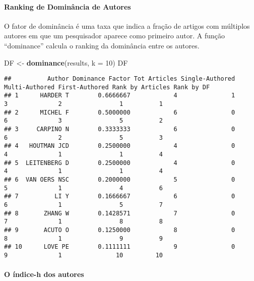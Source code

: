 \documentclass[]{article}
\newenvironment{Shaded}{\begin{snugshade}}{\end{snugshade}}
\newcommand{\DataTypeTok}[1]{\textcolor[rgb]{0.13,0.29,0.53}{#1}}
\newcommand{\DecValTok}[1]{\textcolor[rgb]{0.00,0.00,0.81}{#1}}
\newcommand{\KeywordTok}[1]{\textcolor[rgb]{0.13,0.29,0.53}{\textbf{#1}}}
\newcommand{\NormalTok}[1]{#1}
\newcommand{\StringTok}[1]{\textcolor[rgb]{0.31,0.60,0.02}{#1}}
\let\oldparagraph\paragraph
\renewcommand{\paragraph}[1]{\oldparagraph{#1}\mbox{}}
\begin{document}
\hypertarget{ranking-de-dominancia-de-autores}{%
\paragraph{Ranking de Dominância de
Autores}\label{ranking-de-dominancia-de-autores}}

O fator de dominância é uma taxa que indica a fração de artigos com
múltiplos autores em que um pesquisador aparece como primeiro autor. A
função ``dominance'' calcula o ranking da dominância entre os autores.

\begin{Shaded}
\begin{Highlighting}[]
\NormalTok{DF <-}\StringTok{ }\KeywordTok{dominance}\NormalTok{(results, }\DataTypeTok{k =} \DecValTok{10}\NormalTok{)}
\NormalTok{DF}
\end{Highlighting}
\end{Shaded}

\begin{verbatim}
##          Author Dominance Factor Tot Articles Single-Authored Multi-Authored First-Authored Rank by Articles Rank by DF
## 1      HARDER T        0.6666667            4               1              3              2                1          1
## 2      MICHEL F        0.5000000            6               0              6              3                5          2
## 3     CARPINO N        0.3333333            6               0              6              2                5          3
## 4   HOUTMAN JCD        0.2500000            4               0              4              1                1          4
## 5  LEITENBERG D        0.2500000            4               0              4              1                1          4
## 6  VAN OERS NSC        0.2000000            5               0              5              1                4          6
## 7          LI Y        0.1666667            6               0              6              1                5          7
## 8       ZHANG W        0.1428571            7               0              7              1                8          8
## 9       ACUTO O        0.1250000            8               0              8              1                9          9
## 10      LOVE PE        0.1111111            9               0              9              1               10         10
\end{verbatim}

\hypertarget{o-indice-h-dos-autores}{%
\paragraph{O índice-h dos autores}\label{o-indice-h-dos-autores}}
\end{document}
